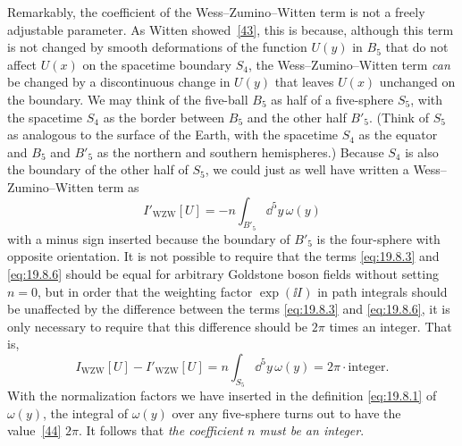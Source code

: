 Remarkably, the coefficient of the Wess--Zumino--Witten term is not a freely adjustable parameter. As Witten showed~\hyperref[ch19-ref-43]{[43]}, this is because, although this term is not changed by smooth deformations of the function $U(y)$ in $B_5$ that do not affect $U(x)$ on the spacetime boundary $S_4$, the Wess--Zumino--Witten term \emph{can} be changed by a discontinuous change in $U(y)$ that leaves $U(x)$ unchanged on the boundary. We may think of the five-ball $B_5$ as half of a five-sphere $S_5$, with the spacetime $S_4$ as the border between $B_5$ and the other half $B'_5$. (Think of $S_5$ as analogous to the surface of the Earth, with the spacetime $S_4$ as the equator and $B_5$ and $B'_5$ as the northern and southern hemispheres.) Because $S_4$ is also the boundary of the other half of $S_5$, we could just as well have written a Wess--Zumino--Witten term as
\begin{equation}
I'_{\mathrm{WZW}}[U]
=-n\int_{B'_5}\dd^5y\,\omega(y)
\tag{19.8.6}\label{eq:19.8.6}
\end{equation}
with a minus sign inserted because the boundary of $B'_5$ is the four-sphere with opposite orientation. It is not possible to require that the terms \eqref{eq:19.8.3} and \eqref{eq:19.8.6} should be equal for arbitrary Goldstone boson fields without setting $n=0$, but in order that the weighting factor $\exp(\ii I)$ in path integrals should be unaffected by the difference between the terms \eqref{eq:19.8.3} and \eqref{eq:19.8.6}, it is only necessary to require that this difference should be $2\pi$ times an integer. That is,
\begin{equation}
I_{\mathrm{WZW}}[U]-I'_{\mathrm{WZW}}[U]
=n\int_{S_5}\dd^5y\,\omega(y)
=2\pi\cdot\text{integer}.
\tag{19.8.7}\label{eq:19.8.7}
\end{equation}
With the normalization factors we have inserted in the definition \eqref{eq:19.8.1} of $\omega(y)$, the integral of $\omega(y)$ over any five-sphere turns out to have the value~\hyperref[ch19-ref-44]{[44]} $2\pi$. It follows that \emph{the coefficient $n$ must be an integer}.

